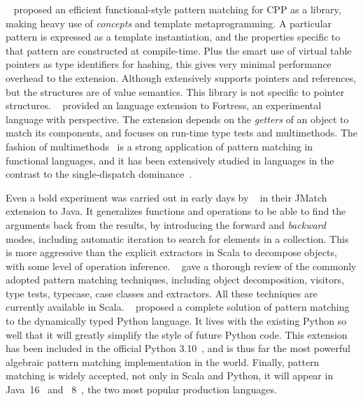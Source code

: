 ~\cite{solodkyy2013open} proposed an efficient functional-style pattern matching for \gls{CPP} as a library,
making heavy use of {\CPP} \emph{concepts} and template metaprogramming.
A particular pattern is expressed as a template instantiation, and the properties specific to that pattern are constructed at compile-time.
Plus the smart use of virtual table pointers as type identifiers for hashing, this gives very minimal performance overhead to the extension.
Although {\CPP} extensively supports pointers and references, but the structures are of value semantics.
This library is not specific to pointer structures.
~\cite{ryu2010adding} provided an language extension to Fortress, an experimental language with {\OO} perspective.
The extension depends on the \emph{getters} of an object to match its components,
and focuses on run-time type tests and multimethods.
The fashion of multimethods~\cite{muschevici2008multiple} is a strong application of pattern matching in functional languages,
and it has been extensively studied in {\OO} languages in the contrast to the single-dispatch dominance~\cite{chambers1992object,ernst1998predicate,clifton2006multijava}.

Even a bold experiment was carried out in early days by ~\cite{liu2003jmatch} in their JMatch extension to Java.
It generalizes functions and operations to be able to find the arguments back from the results, by introducing the forward and \emph{backward} modes,
including automatic iteration to search for elements in a collection.
This is more aggressive than the explicit extractors in Scala to decompose objects, with some level of operation inference.
~\cite{emir2007matching} gave a thorough review of the commonly adopted {\OO} pattern matching techniques,
including object decomposition, visitors, type tests, typecase, case classes and extractors.
All these techniques are currently available in Scala.
~\cite{kohn2020dynamic} proposed a complete solution of pattern matching to the dynamically typed Python language.
It lives with the existing Python so well that it will greatly simplify the style of future Python code.
This extension has been included in the official Python 3.10~\cite{bucher2020PEP634,kohn2020PEP635},
and is thus far the most powerful algebraic pattern matching implementation in the {\OO} world.
Finally, {\OO} pattern matching is widely accepted, not only in Scala and Python,
it will appear in Java~16~\cite{bierman2020JEP394} and {\Csharp}~8~\cite{microsoft2020csharp},
the two most popular production {\OO} languages.


